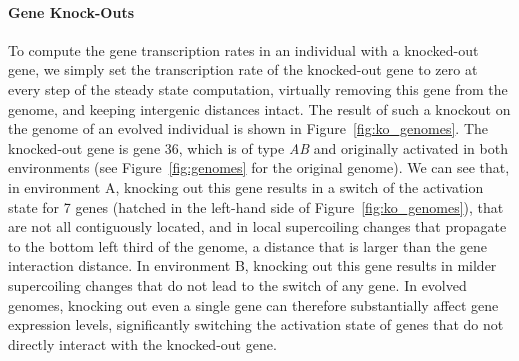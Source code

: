 \paragraph{Gene Knock-Outs}
To compute the gene transcription rates in an individual with a knocked-out gene, we simply set the transcription rate of the knocked-out gene to zero at every step of the steady state computation, virtually removing this gene from the genome, and keeping intergenic distances intact.
The result of such a knockout on the genome of an evolved individual is shown in Figure~\ref{fig:ko_genomes}.
The knocked-out gene is gene 36, which is of type \emph{AB} and originally activated in both environments (see Figure~\ref{fig:genomes} for the original genome).
We can see that, in environment A, knocking out this gene results in a switch of the activation state for 7 genes (hatched in the left-hand side of Figure~\ref{fig:ko_genomes}), that are not all contiguously located, and in local supercoiling changes that propagate to the bottom left third of the genome, a distance that is larger than the gene interaction distance.
In environment B, knocking out this gene results in milder supercoiling changes that do not lead to the switch of any gene.
In evolved genomes, knocking out even a single gene can therefore substantially affect gene expression levels, significantly switching the activation state of genes that do not directly interact with the knocked-out gene.

